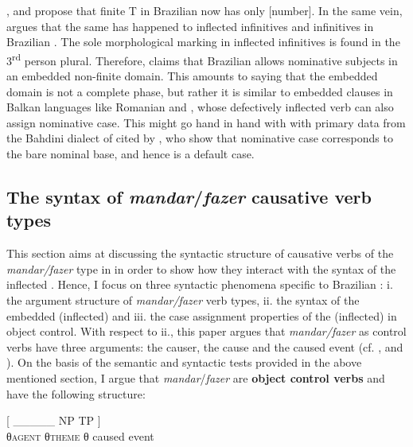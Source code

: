 \documentclass[output=paper]{langsci/langscibook}
\begin{document}
\citet{Nunes2008}, \citet{Ferreira2009} and \citet{Rodrigues2004} propose that finite T in Brazilian  now has only [number]. In the same vein, \citet{Cyrino2010} argues that the same has happened to inflected infinitives and  infinitives in Brazilian . The sole morphological marking in inflected infinitives is found in the 3\textsuperscript{rd} person plural. Therefore, \citet{Cyrino2010} claims that Brazilian  allows nominative subjects in an embedded non-finite domain. This amounts to saying that the embedded domain is not a complete phase, but rather it is similar to embedded  clauses in Balkan languages like Romanian and , whose defectively inflected verb can also assign nominative case. This might go hand in hand with with primary data from the Bahdini dialect of   cited by \citet{Manzini2017}, who show that nominative case corresponds to the bare nominal base, and hence is a default case.  

\subsection{The syntax of \textit{mandar}/\textit{fazer} causative verb types} %

This section aims at discussing the syntactic structure of causative verbs of the \textit{mandar\slash fazer} type in  in order to show how they interact with the syntax of the inflected .\textbf{ }Hence, I focus on three syntactic phenomena specific to Brazilian : i. the argument structure of \textit{mandar\slash fazer}\textbf{ }verb types, ii. the syntax of the embedded (inflected)  and iii.\textbf{ }the case assignment properties of the (inflected)  in object control. With respect to ii., this paper argues that \textit{mandar\slash fazer} as control verbs have three arguments: the causer, the cause and the caused event (cf. \citealt{Zubizarreta1985}, \citealt{Alsina1992} and \citealt{Ippolito2000}). On the basis of the semantic and syntactic tests provided in the above mentioned section, I argue that \textit{mandar}/\textit{fazer} are \textbf{object control verbs} and have the following structure:

\ea%
    \label{ex:moreno:20}
     [     \_\_\_\_\_         NP                  TP ]\\
                  {}                                {}    {θ\textsc{agent}}  {θ\textsc{theme}}   {θ caused event} \\
    
\end{document}
